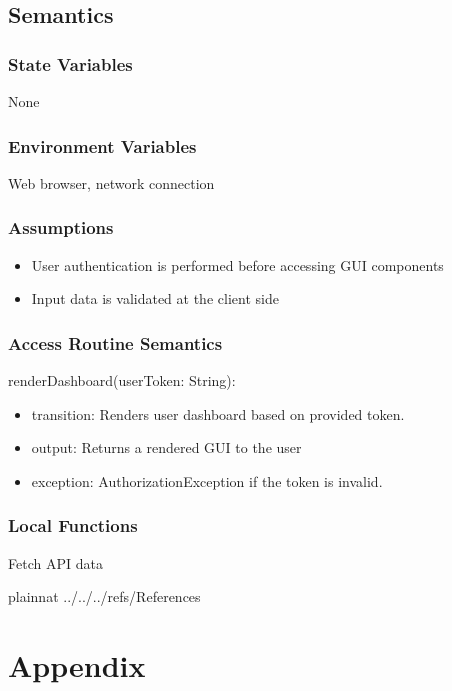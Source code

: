 \documentclass[12pt, titlepage]{article}
\begin{document}
\subsection{Semantics}

\subsubsection{State Variables}
None

\subsubsection{Environment Variables}
Web browser, network connection

\subsubsection{Assumptions}
\begin{itemize}
  \item User authentication is performed before accessing GUI components
  \item Input data is validated at the client side
\end{itemize}

\subsubsection{Access Routine Semantics}

\noindent renderDashboard(userToken: String):
\begin{itemize}
  \item transition: Renders user dashboard based on provided token.
  \item output: Returns a rendered GUI to the user
  \item exception: AuthorizationException if the token is invalid.
\end{itemize}

\subsubsection{Local Functions}
Fetch API data

\newpage

 {plainnat}
 {../../../refs/References}

\newpage

\section{Appendix} \label{Appendix}
\end{document}
